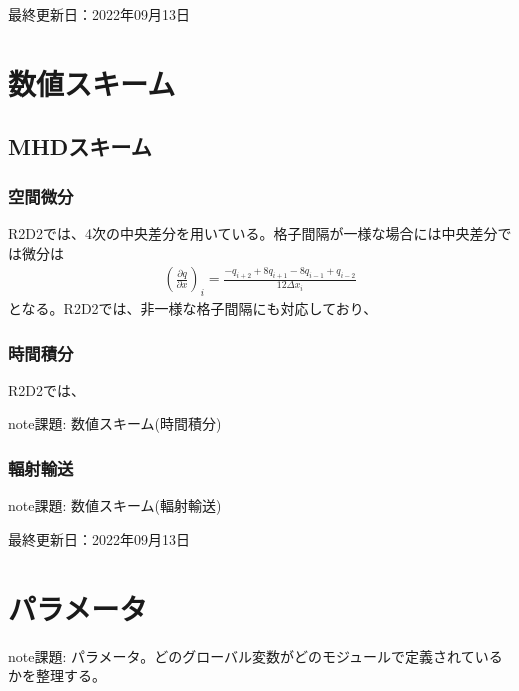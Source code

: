 \documentclass[letterpaper,10pt,dvipdfmx,report]{sphinxmanual}
\begin{document}
\sphinxAtStartPar
最終更新日：2022年09月13日

\sphinxstepscope


\chapter{数値スキーム}
\label{\detokenize{scheme:id1}}\label{\detokenize{scheme::doc}}

\section{MHDスキーム}
\label{\detokenize{scheme:mhd}}

\subsection{空間微分}
\label{\detokenize{scheme:id2}}
\sphinxAtStartPar
R2D2では、4次の中央差分を用いている。格子間隔が一様な場合には中央差分では微分は
\begin{equation*}
\begin{split}\left(\frac{\partial q}{\partial x}\right)_i =\frac{-q_{i+2}+8q_{i+1}-8q_{i-1}+q_{i-2}}{12\Delta x_i}\end{split}
\end{equation*}
\sphinxAtStartPar
となる。R2D2では、非一様な格子間隔にも対応しており、


\subsection{時間積分}
\label{\detokenize{scheme:id3}}
\sphinxAtStartPar
R2D2では、

\begin{sphinxadmonition}{note}{\label{\detokenize{scheme:id4}}課題:}
\sphinxAtStartPar
数値スキーム(時間積分)
\end{sphinxadmonition}


\subsection{輻射輸送}
\label{\detokenize{scheme:id5}}
\begin{sphinxadmonition}{note}{\label{\detokenize{scheme:id6}}課題:}
\sphinxAtStartPar
数値スキーム(輻射輸送)
\end{sphinxadmonition}

\sphinxAtStartPar
最終更新日：2022年09月13日

\sphinxstepscope


\chapter{パラメータ}
\label{\detokenize{parameter:id1}}\label{\detokenize{parameter::doc}}
\begin{sphinxadmonition}{note}{\label{\detokenize{parameter:id2}}課題:}
\sphinxAtStartPar
パラメータ。どのグローバル変数がどのモジュールで定義されているかを整理する。
\end{sphinxadmonition}
\end{document}
